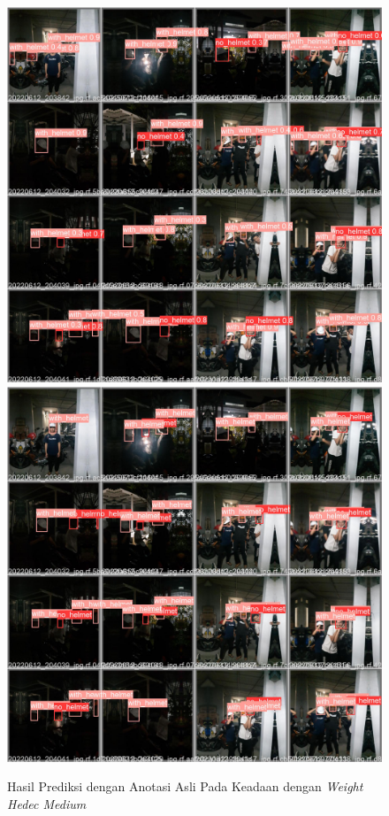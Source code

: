\begin{figure}[ht]
  \centering
  \includegraphics[scale=0.1]{gambar/train_v2_val/low_ligjt/customMedium/val_batch0_pred.jpg}
  \includegraphics[scale=0.1]{gambar/train_v2_val/low_ligjt/customMedium/val_batch0_labels.jpg}
  \caption{Hasil Prediksi dengan Anotasi Asli Pada Keadaan dengan \emph{Weight Hedec Medium}}
\end{figure}

